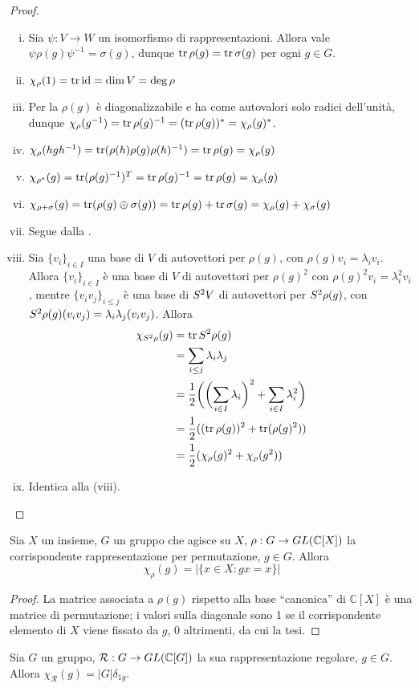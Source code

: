 \begin{proof}
\leavevmode
\begin{enumerate}[(i)]
\item Sia $\psi:V\to W$ un isomorfismo di rappresentazioni. Allora vale $\psi\rho(g)\psi^{-1}=\sigma(g)$, dunque $\operatorname{tr}\rho(g)=\operatorname{tr}\sigma(g)$ per ogni $g\in G$.
\item $\chi_\rho(1)=\operatorname{tr}\operatorname{id}=\dim V=\deg\rho$
\item Per la  $\rho(g)$ è diagonalizzabile e ha come autovalori solo radici dell'unità, dunque $\chi_\rho(g^{-1})=\operatorname{tr}\rho(g)^{-1}=(\operatorname{tr}\rho(g))^*=\chi_\rho(g)^*$.
\item $\chi_\rho(hgh^{-1})=\operatorname{tr}(\rho(h)\rho(g)\rho(h)^{-1})=\operatorname{tr}\rho(g)=\chi_\rho(g)$
\item $\chi_{\rho^*}(g)=\operatorname{tr}(\rho(g)^{-1})^T=\operatorname{tr}\rho(g)^{-1}=\operatorname{tr}\rho(g)=\chi_\rho(g)$
\item $\chi_{\rho+\sigma}(g)=\operatorname{tr}(\rho(g)\oplus\sigma(g))=\operatorname{tr}\rho(g)+\operatorname{tr}\sigma(g)=\chi_\rho(g)+\chi_\sigma(g)$
\item Segue dalla .
\item Sia $\{v_i\}_{i\in I}$ una base di $V$ di autovettori per $\rho(g)$, con $\rho(g)v_i=\lambda_iv_i$. Allora $\{v_i\}_{i\in I}$ è una base di $V$ di autovettori per $\rho(g)^2$ con $\rho(g)^2v_i=\lambda_i^2v_i$, mentre $\{v_iv_j\}_{i\le j}$ è una base di $S^2V$ di autovettori per $S^2\rho(g)$, con $S^2\rho(g)(v_iv_j)=\lambda_i\lambda_j(v_iv_j)$. Allora
\begin{align*}
\chi_{S^2\rho}(g)&=\operatorname{tr}S^2\rho(g)\\
&=\sum_{i\le j}\lambda_i\lambda_j\\
&=\frac{1}{2}\biggl(\biggl(\sum_{i\in I}\lambda_i\biggr)^2+\sum_{i\in I}\lambda_i^2\biggr)\\
&=\frac{1}{2}((\operatorname{tr}\rho(g))^2+\operatorname{tr}(\rho(g)^2))\\
&=\frac{1}{2}(\chi_\rho(g)^2+\chi_\rho(g^2))
\end{align*}
\item Identica alla (viii).
\end{enumerate}
\end{proof}

\begin{proposition}
Sia $X$ un insieme, $G$ un gruppo che agisce su $X$, $\rho:G\to GL(\mathbb{C}[X])$ la corrispondente rappresentazione per permutazione, $g\in G$. Allora
$$
\chi_\rho(g)=|\{x\in X:gx=x\}|
$$
\end{proposition}
\begin{proof}
La matrice associata a $\rho(g)$ rispetto alla base ``canonica'' di $\mathbb{C}[X]$ è una matrice di permutazione; i valori sulla diagonale sono 1 se il corrispondente elemento di $X$ viene fissato da $g$, 0 altrimenti, da cui la tesi.
\end{proof}

\begin{corollary}
Sia $G$ un gruppo, $\mathcal{R}:G\to GL(\mathbb{C}[G])$ la sua rappresentazione regolare, $g\in G$. Allora $\chi_\mathcal{R}(g)=|G|\delta_{1g}$.
\end{corollary}

